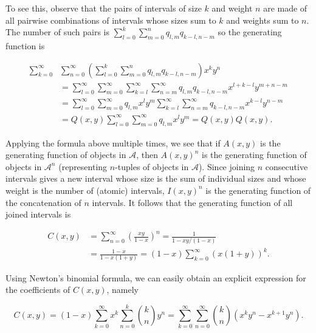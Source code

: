 \documentclass{article}
\begin{document}
To see this, observe that the pairs of intervals of size $k$ and weight
$n$ are made of all pairwise combinations of intervals whose sizes sum to
$k$ and weights sum to $n$. The number of such pairs is $\sum_{l=0}^k
\sum_{m=0}^n q_{l,m}q_{k-l,n-m}$ so the generating function is

\begin{equation*}
\begin{split}
\sum_{k=0}^\infty &\sum_{n=0}^\infty \left( \sum_{l=0}^k \sum_{m=0}^n
  q_{l,m}q_{k-l,n-m}\right) x^k y^n \\
&= \sum_{l=0}^\infty \sum_{m=0}^\infty \sum_{k=l}^\infty \sum_{n=m}^\infty
  q_{l,m}q_{k-l,n-m}x^{l + k-l} y^{m + n-m} \\ 
&= \sum_{l=0}^\infty \sum_{m=0}^\infty q_{l,m} x^l y^m
  \sum_{k=l}^\infty \sum_{n=m}^\infty
  q_{k-l,n-m}x^{k-l} y^{n-m} \\
&= Q(x,y) \sum_{l=0}^\infty \sum_{m=0}^\infty q_{l,m} x^l y^m
 = Q(x,y)Q(x,y).
\end{split}
\end{equation*}


Applying the formula above multiple times, we see that if $A(x,y)$ is the
generating function of objects in $\mathcal{A}$, then $A(x,y)^n$ is the
generating function of objects in $\mathcal{A}^n$ (representing $n$-tuples
of objects in $\mathcal{A}$). Since joining $n$ consecutive intervals
gives a new interval whose size is the sum of individual sizes and whose
weight is the number of (atomic) intervals, $I(x,y)^n$ is the generating
function of the concatenation of $n$ intervals. It follows that the
generating function of all joined intervals is

\begin{equation}
\begin{split}
\label{eq:C}
C(x,y) &= \sum_{n=0}^\infty \left( \frac{xy}{1-x} \right)^n
= \frac{1}{1 - xy/(1-x)} \\
&= \frac{1-x}{1-x(1+y)} = (1-x) \sum_{k=0}^\infty \left(x(1+y) \right)^k.
\end{split}
\end{equation}

Using Newton's binomial formula, we can easily obtain an explicit
expression for the coefficients of $C(x,y)$, namely

\begin{equation*}
C(x,y) = (1-x)\sum_{k=0}^\infty x^k\sum_{n=0}^k {k \choose n} y^n
= \sum_{k=0}^\infty\sum_{n=0}^\infty{k \choose n} (x^ky^n - x^{k+1}y^n).
\end{equation*}
\end{document}
